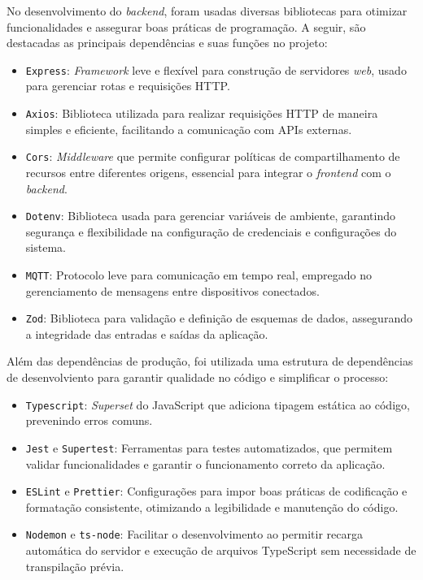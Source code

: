 No desenvolvimento do \textit{backend}, foram usadas diversas bibliotecas para otimizar funcionalidades e assegurar boas práticas de programação. A seguir, são destacadas as principais dependências e suas funções no projeto:

\begin{itemize}
    \item \texttt{Express}: \textit{Framework} leve e flexível para construção de servidores \textit{web}, usado para gerenciar rotas e requisições HTTP.
    \item \texttt{Axios}: Biblioteca utilizada para realizar requisições HTTP de maneira simples e eficiente, facilitando a comunicação com APIs externas.
    \item \texttt{Cors}: \textit{Middleware} que permite configurar políticas de compartilhamento de recursos entre diferentes origens, essencial para integrar o \textit{frontend} com o \textit{backend}.
    \item \texttt{Dotenv}: Biblioteca usada para gerenciar variáveis de ambiente, garantindo segurança e flexibilidade na configuração de credenciais e configurações do sistema.
    \item \texttt{MQTT}: Protocolo leve para comunicação em tempo real, empregado no gerenciamento de mensagens entre dispositivos conectados.
    \item \texttt{Zod}: Biblioteca para validação e definição de esquemas de dados, assegurando a integridade das entradas e saídas da aplicação.
\end{itemize}

Além das dependências de produção, foi utilizada uma estrutura de dependências de desenvolviento para garantir qualidade no código e simplificar o processo:

\begin{itemize}
    \item \texttt{Typescript}: \textit{Superset} do JavaScript que adiciona tipagem estática ao código, prevenindo erros comuns.
    \item \texttt{Jest} e \texttt{Supertest}: Ferramentas para testes automatizados, que permitem validar funcionalidades e garantir o funcionamento correto da aplicação.
    \item \texttt{ESLint} e \texttt{Prettier}: Configurações para impor boas práticas de codificação e formatação consistente, otimizando a legibilidade e manutenção do código.
    \item \texttt{Nodemon} e \texttt{ts-node}: Facilitar o desenvolvimento ao permitir recarga automática do servidor e execução de arquivos TypeScript sem necessidade de transpilação prévia.
\end{itemize}

